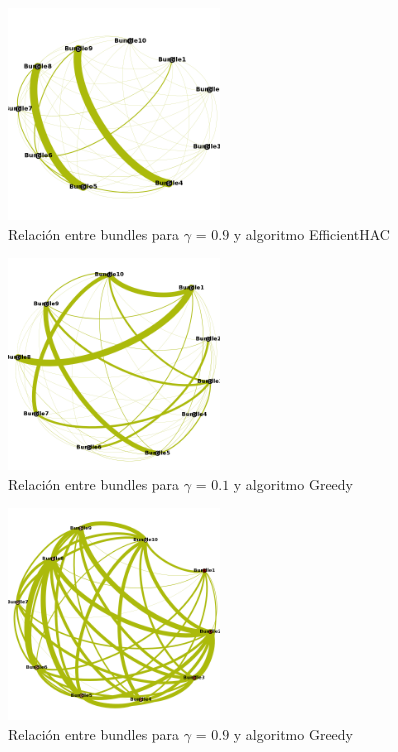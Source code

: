 \begin{figure}[H]
  \centering
    \includegraphics[width=0.5\textwidth]{resultados/papers/intra_inter/effhac09.png}
  \caption{Relación entre bundles para $\gamma$ = $0.9$ y algoritmo EfficientHAC}
  \label{res:img-gamma09-effhac}
\end{figure}

\begin{figure}[H]
  \centering
    \includegraphics[width=0.5\textwidth]{resultados/papers/intra_inter/greedy01.png}
  \caption{Relación entre bundles para $\gamma$ = $0.1$ y algoritmo Greedy}
  \label{res:img-gamma01-greedy}
\end{figure}

\begin{figure}[H]
  \centering
    \includegraphics[width=0.5\textwidth]{resultados/papers/intra_inter/greedy09.png}
  \caption{Relación entre bundles para $\gamma$ = $0.9$ y algoritmo Greedy}
  \label{res:img-gamma09-greedy}
\end{figure}

